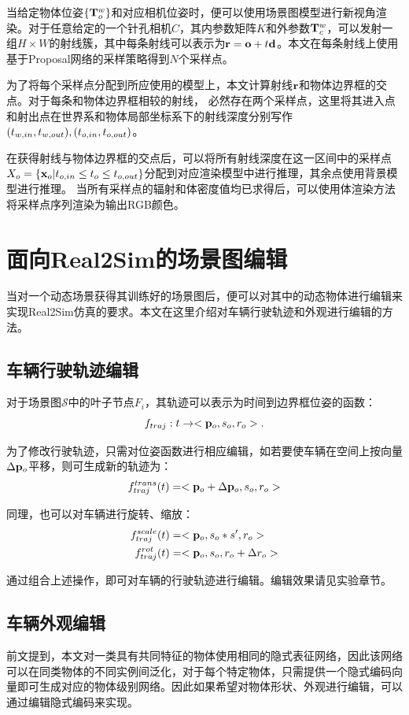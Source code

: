 当给定物体位姿$\{\mathbf{T}_o^w\}$和对应相机位姿时，便可以使用场景图模型进行新视角渲染。对于任意给定的一个针孔相机$C$，其内参数矩阵$K$和外参数$\mathbf{T}_c^w$，可以发射一组$H\times W$的射线簇，其中每条射线可以表示为${\mathbf{r}} = \mathbf{o} + t{\mathbf{d}}$。本文在每条射线上使用基于Proposal网络的采样策略得到$N$个采样点。

为了将每个采样点分配到所应使用的模型上，本文计算射线${\mathbf{r}}$和物体边界框的交点。对于每条和物体边界框相较的射线， 必然存在两个采样点，这里将其进入点和射出点在世界系和物体局部坐标系下的射线深度分别写作$({t_{w, in}}, {t_{w, out}}), ({t_{o, in}}, {t_{o, out}})$。

在获得射线与物体边界框的交点后，可以将所有射线深度在这一区间中的采样点$X_o =\{{{\mathbf{x}}_o} |{t_{o, in}} \leq t_{o} \leq {t_{o, out}}\}$分配到对应渲染模型中进行推理，其余点使用背景模型进行推理。
当所有采样点的辐射和体密度值均已求得后，可以使用体渲染方法将采样点序列渲染为输出RGB颜色。

\section{面向Real2Sim的场景图编辑}

当对一个动态场景获得其训练好的场景图后，便可以对其中的动态物体进行编辑来实现Real2Sim仿真的要求。本文在这里介绍对车辆行驶轨迹和外观进行编辑的方法。

\subsection{车辆行驶轨迹编辑}
对于场景图$\mathcal{S}$中的叶子节点$F_i$，其轨迹可以表示为时间到边界框位姿的函数：
\begin{equation}
    f_{traj}: \quad t\to<\po, s_o, r_o>.
\end{equation}

为了修改行驶轨迹，只需对位姿函数进行相应编辑，如若要使车辆在空间上按向量$\Delta{\mathbf{p}_o}$平移，则可生成新的轨迹为：
\begin{equation}
    f_{traj}^{trans}(t) = <{\mathbf{p}_o} + \Delta{\mathbf{p}_o}, s_o, r_o>
\end{equation}

同理，也可以对车辆进行旋转、缩放：
\begin{align}
    f_{traj}^{scale}(t) &= <{\mathbf{p}_o}, s_o * s', r_o>\\
    f_{traj}^{rot}(t) &= <{\mathbf{p}_o}, s_o, r_o + \Delta r_o>
\end{align}

通过组合上述操作，即可对车辆的行驶轨迹进行编辑。编辑效果请见实验章节。

\subsection{车辆外观编辑}
前文提到，本文对一类具有共同特征的物体使用相同的隐式表征网络，因此该网络可以在同类物体的不同实例间泛化，对于每个特定物体，只需提供一个隐式编码向量即可生成对应的物体级别网络。因此如果希望对物体形状、外观进行编辑，可以通过编辑隐式编码来实现。


